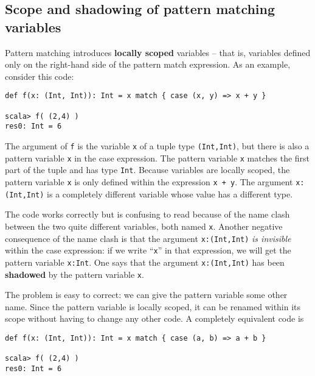 \subsection{Scope and shadowing of pattern matching variables\label{subsec:Scope-and-shadowing-variables}}

Pattern matching introduces \textbf{locally scoped}
variables – that is, variables defined only on the right-hand side
of the pattern match expression. As an example, consider this code:
\begin{lstlisting}
def f(x: (Int, Int)): Int = x match { case (x, y) => x + y }

scala> f( (2,4) )
res0: Int = 6
\end{lstlisting}
The argument of \lstinline!f!
is the variable \lstinline!x!
of a tuple type \lstinline!(Int,Int)!,
but there is also a pattern variable \lstinline!x!
in the case expression. The pattern variable \lstinline!x!
matches the first part of the tuple and has type \lstinline!Int!.
Because variables are locally scoped, the pattern variable \lstinline!x!
is only defined within the expression \lstinline!x + y!.
The argument \lstinline!x:(Int,Int)!
is a completely different variable whose value has a different type.

The code works correctly but is confusing to read because of the name
clash between the two quite different variables, both named \lstinline!x!.
Another negative consequence of the name clash is that the argument
\lstinline!x:(Int,Int)!
\emph{is invisible} within the case expression: if we write ``\lstinline!x!''
in that expression, we will get the pattern variable \lstinline!x:Int!.
One says that the argument \lstinline!x:(Int,Int)!
has been \textbf{shadowed} by the pattern variable
\lstinline!x!.

The problem is easy to correct: we can give the pattern variable some
other name. Since the pattern variable is locally scoped, it can be
renamed within its scope without having to change any other code.
A completely equivalent code is
\begin{lstlisting}
def f(x: (Int, Int)): Int = x match { case (a, b) => a + b }

scala> f( (2,4) )
res0: Int = 6
\end{lstlisting}

